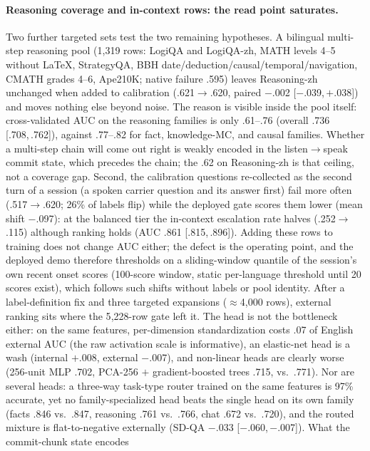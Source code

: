 \paragraph{Reasoning coverage and in-context rows: the read point
saturates.} Two further targeted sets test the two remaining
hypotheses. A bilingual multi-step reasoning pool (1{,}319 rows:
LogiQA and LogiQA-zh, MATH levels 4--5 without LaTeX, StrategyQA,
BBH date/deduction/causal/temporal/navigation, CMATH grades 4--6,
Ape210K; native failure .595) leaves Reasoning-zh unchanged when
added to calibration (.621$\to$.620, paired $-$.002
[$-$.039,\,$+$.038]) and moves nothing else beyond noise. The reason
is visible inside the pool itself: cross-validated AUC on the
reasoning families is only .61--.76 (overall .736 [.708,\,.762]),
against .77--.82 for fact, knowledge-MC, and causal families. Whether
a multi-step chain will come out right is weakly encoded in the
listen$\to$speak commit state, which precedes the chain; the .62 on
Reasoning-zh is that ceiling, not a coverage gap. Second, the
calibration questions re-collected as the second turn of a
session (a spoken carrier question and its answer first) fail more
often (.517$\to$.620; 26\% of labels flip) while the deployed gate
scores them lower (mean shift $-$.097): at the balanced tier
the in-context escalation rate halves (.252$\to$.115) although ranking
holds (AUC .861 [.815,\,.896]). Adding these rows to training does
not change AUC either; the defect is the operating point, and the
deployed demo therefore thresholds on a sliding-window quantile of
the session's own recent onset scores (100-score window, static
per-language threshold until 20 scores exist), which follows such
shifts without labels or pool identity. After a label-definition fix
and three targeted expansions ($\approx$4{,}000 rows), external
ranking sits where the 5{,}228-row gate left it. The head is not the
bottleneck either: on the same features, per-dimension
standardization costs .07 of English external AUC (the raw
activation scale is informative), an elastic-net head is a wash
(internal $+$.008, external $-$.007), and non-linear heads are
clearly worse (256-unit MLP .702, PCA-256 $+$ gradient-boosted trees
.715, vs.\ .771). Nor are several heads: a three-way task-type
router trained on the same features is 97\% accurate, yet no
family-specialized head beats the single head on its own family
(facts .846 vs.\ .847, reasoning .761 vs.\ .766, chat .672 vs.\
.720), and the routed mixture is flat-to-negative externally (SD-QA
$-$.033 [$-$.060,\,$-$.007]). What the commit-chunk state encodes
